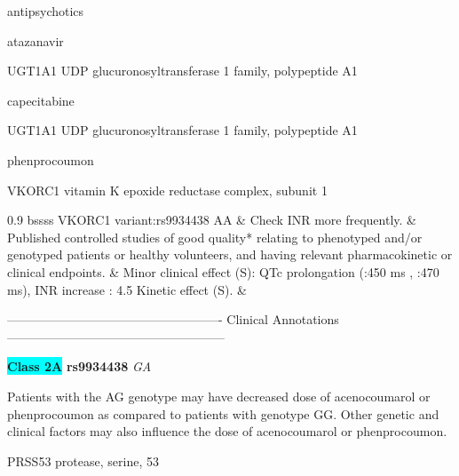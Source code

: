 \documentclass{resume} %
\begin{document}
\begin{rSection}{ antipsychotics }
\begin{rSection}{ atazanavir }
\begin{rSubsection}{ UGT1A1 }{ UDP glucuronosyltransferase 1 family, polypeptide A1 }{}{}
\begin{rSection}{ capecitabine }
\begin{rSubsection}{ UGT1A1 }{ UDP glucuronosyltransferase 1 family, polypeptide A1 }{}{}
\begin{rSection}{ phenprocoumon }
\begin{rSubsection}{ VKORC1 }{ vitamin K epoxide reductase complex, subunit 1 }{}{}
\begin{center}
\begin{tabularx}{0.9\textwidth}{ bssss }
		         VKORC1 variant:rs9934438 AA & Check INR more frequently. & Published controlled studies of good quality* relating to phenotyped and/or genotyped patients or healthy volunteers, and having relevant pharmacokinetic or clinical endpoints. & Minor clinical effect (S): QTc prolongation (:450 ms , :470 ms),  INR increase : 4.5 Kinetic effect (S). &
\\
		\end{tabularx}
		\end{center}
		\normalsize
		\vspace{10pt}
		        
\item[] ---------------------------------------------------- Clinical Annotations -----------------------------------------------------\newline
\item \textbf{\colorbox{cyan} {Class 2A}} \textbf{ rs9934438 } \textit{ GA }
\item[] Patients with the AG genotype may have decreased dose of acenocoumarol or phenprocoumon as compared to patients with genotype GG. Other genetic and clinical factors may also influence the dose of acenocoumarol or phenprocoumon.
\end{rSubsection}
\end{rSection}\begin{rSubsection}{ PRSS53 }{ protease, serine, 53 }{}{}
\item[]


\end{rSubsection}
\end{rSubsection}
\end{rSection}
\end{rSubsection}
\end{rSection}
\end{rSection}
\end{document}

